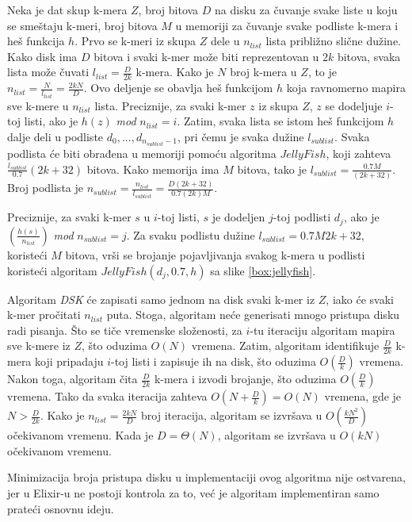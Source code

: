 \documentclass[12pt,oneside]{memoir}
\begin{document}
\newpage

Neka je dat skup k-mera $Z$, broj bitova $D$ na disku za čuvanje svake liste u koju se smeštaju k-meri, broj bitova $M$ u memoriji za čuvanje svake podliste k-mera i heš funkcija $h$. Prvo se k-meri iz skupa $Z$ dele u $n_{list}$ lista približno slične dužine. Kako disk ima $D$ bitova i svaki k-mer može biti reprezentovan u $2k$ bitova, svaka lista može čuvati $l_{list} =  \frac{D}{2k}$ k-mera. Kako je $N$ broj k-mera u $Z$, to je $n_{list} = \frac{N}{l_{list}} = \frac{2kN}{D}$. Ovo deljenje se obavlja heš funkcijom $h$ koja ravnomerno mapira sve k-mere u $n_{list}$ lista. Preciznije, za svaki k-mer $z$ iz skupa $Z$, $z$ se dodeljuje $i$-toj listi, ako je $h(z)$ \textit{mod} $n_{list} = i$. Zatim, svaka lista se istom heš funkcijom $h$ dalje deli u podliste ${d_0,..., d_{n_{sublist} - 1}}$, pri čemu je svaka dužine $l_{sublist}$. Svaka podlista će biti obrađena u memoriji pomoću algoritma $JellyFish$, koji zahteva $\frac{l_{sublist}}{0.7}(2k +32)$ bitova. Kako memorija ima $M$ bitova, tako je $l_{sublist} = \frac{0.7M}{(2k + 32)}$. Broj podlista je  $n_{sublist} = \frac{n_{list}}{l_{sublist}} = \frac{D(2k + 32)}{0.7(2k)M}$. 

Preciznije, za svaki k-mer $s$ u $i$-toj listi, $s$ je dodeljen $j$-toj podlisti $d_j$, ako je $(\frac{h(s)}{n_{list}})$ \textit{mod} $n_{sublist} = j$. Za svaku podlistu dužine $l_{sublist} = {0.7M}{2k + 32}$, koristeći $M$ bitova, vrši se brojanje pojavljivanja svakog k-mera u podlisti koristeći algoritam $JellyFish(d_j, 0.7, h)$ sa slike \ref{box:jellyfish}.

Algoritam \textit{DSK} će zapisati samo jednom na disk svaki k-mer iz $Z$, iako će svaki k-mer pročitati $n_{list}$ puta. Stoga, algoritam neće generisati mnogo pristupa disku radi pisanja. Što se tiče vremenske složenosti, za $i$-tu iteraciju algoritam mapira sve k-mere iz $Z$, što oduzima $O(N)$ vremena. Zatim, algoritam identifikuje $\frac{D}{2k}$ k-mera koji pripadaju $i$-toj listi i zapisuje ih na disk, što oduzima $O(\frac{D}{k})$ vremena. Nakon toga, algoritam  čita $\frac{D}{2k}$ k-mera i izvodi brojanje, što oduzima $O(\frac{D}{k})$ vremena. Tako da svaka iteracija zahteva $O(N + \frac{D}{k}) = O(N)$ vremena, gde je $N > \frac{D}{2k}$. Kako je $n_{list} = \frac{2kN}{D}$ broj iteracija, algoritam se izvršava u $O(\frac{kN^2}{D})$ očekivanom vremenu. Kada je $D = \Theta(N)$, algoritam se izvršava u $O(kN)$ očekivanom vremenu.

Minimizacija broja pristupa disku u implementaciji ovog algoritma nije ostvarena, jer u Elixir-u ne postoji kontrola za to, već je algoritam implementiran samo prateći osnovnu ideju.
\end{document}
